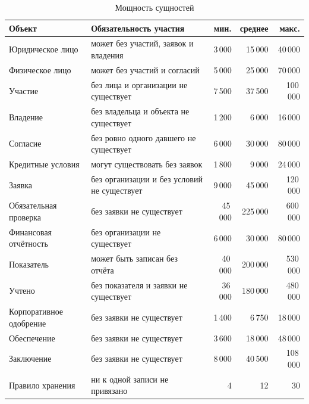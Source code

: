 \begin{table}[H]
\centering
\caption{Мощность сущностей}
\label{tab:power-entities}
\small
\setlength{\tabcolsep}{3pt}
\begin{tabular}{|>{\raggedright\arraybackslash}p{}|>{\raggedright\arraybackslash}p{}|r|r|r|}
\hline
\textbf{Объект} & \textbf{Обязательность участия} & \textbf{мин.} & \textbf{среднее} & \textbf{макс.} \\
\hline
Юридическое лицо & может без участий, заявок и владения & 3\,000 & 15\,000 & 40\,000 \\
\hline
Физическое лицо & может без участий и согласий & 5\,000 & 25\,000 & 70\,000 \\
\hline
Участие & без лица и организации не существует & 7\,500 & 37\,500 & 100\,000 \\
\hline
Владение & без владельца и объекта не существует & 1\,200 & 6\,000 & 16\,000 \\
\hline
Согласие & без ровно одного давшего не существует & 6\,000 & 30\,000 & 80\,000 \\
\hline
Кредитные условия & могут существовать без заявок & 1\,800 & 9\,000 & 24\,000 \\
\hline
Заявка & без организации и без условий не существует & 9\,000 & 45\,000 & 120\,000 \\
\hline
Обязательная проверка & без заявки не существует & 45\,000 & 225\,000 & 600\,000 \\
\hline
Финансовая отчётность & без организации не существует & 6\,000 & 30\,000 & 80\,000 \\
\hline
Показатель & может быть записан без отчёта & 40\,000 & 200\,000 & 530\,000 \\
\hline
Учтено & без показателя и заявки не существует & 36\,000 & 180\,000 & 480\,000 \\
\hline
Корпоративное одобрение & без заявки не существует & 1\,400 & 6\,750 & 18\,000 \\
\hline
Обеспечение & без заявки не существует & 3\,600 & 18\,000 & 48\,000 \\
\hline
Заключение & без заявки не существует & 8\,000 & 40\,500 & 108\,000 \\
\hline
Правило хранения & ни к одной записи не привязано & 4 & 12 & 30 \\
\hline
\end{tabular}
\end{table}

